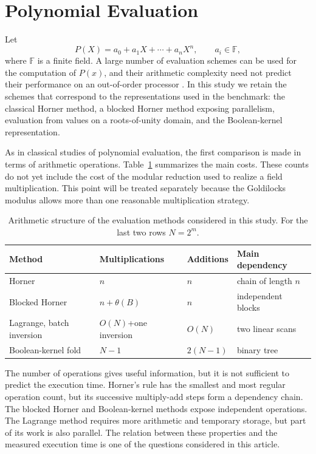 \section{Polynomial Evaluation}
\label{sec:poly-eval}

Let
\[
P(X)=a_0+a_1X+\cdots+a_nX^n,\qquad a_i\in\mathbb{F},
\]
where \(\mathbb{F}\) is a finite field.  A large number of evaluation
schemes can be used for the computation of \(P(x)\), and their arithmetic
complexity need not predict their performance on an out-of-order processor
\cite{ewart2020}.  In this study we retain the schemes that correspond to
the representations used in the benchmark: the classical Horner method, a
blocked Horner method exposing parallelism, evaluation from values on a
roots-of-unity domain, and the Boolean-kernel representation.

As in classical studies of polynomial evaluation, the first comparison is
made in terms of arithmetic operations.  Table~\ref{tab:arith-structure}
summarizes the main costs.  These counts do not yet include the cost of the
modular reduction used to realize a field multiplication.  This point will
be treated separately because the Goldilocks modulus allows more than one
reasonable multiplication strategy.

\begin{table}[ht]
\centering
\caption{Arithmetic structure of the evaluation methods considered in this
study.  For the last two rows \(N=2^m\).}
\label{tab:arith-structure}
\begin{tabular}{llll}
\toprule
Method & Multiplications & Additions & Main dependency\\
\midrule
Horner &
\(n\) &
\(n\) &
chain of length \(n\)\\

Blocked Horner &
\(n+\theta(B)\) &
\(n\) &
independent blocks\\

Lagrange, batch inversion &
\(O(N)\)+one inversion &
\(O(N)\) &
two linear scans\\

Boolean-kernel fold &
\(N-1\) &
\(2(N-1)\) &
binary tree\\
\bottomrule
\end{tabular}
\end{table}

The number of operations gives useful information, but it is not sufficient
to predict the execution time.  Horner's rule has the smallest and most
regular operation count, but its successive multiply-add steps form a
dependency chain.  The blocked Horner and Boolean-kernel methods expose
independent operations.  The Lagrange method requires more arithmetic and
temporary storage, but part of its work is also parallel.  The relation
between these properties and the measured execution time is one of the
questions considered in this article.

